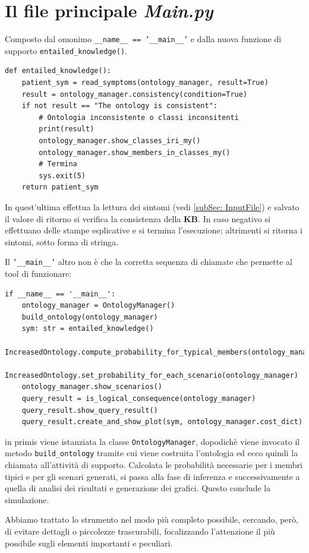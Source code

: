 \section{Il file principale \emph{Main.py}}
Composto  dal omonimo \texttt{__name__ == '__main__'} e dalla nuova funzione di 
supporto \texttt{entailed_knowledge()}.
\begin{verbatim}
def entailed_knowledge():
	patient_sym = read_symptoms(ontology_manager, result=True)
	result = ontology_manager.consistency(condition=True)
	if not result == "The ontology is consistent":
		# Ontologia inconsistente o classi inconsitenti
		print(result)
		ontology_manager.show_classes_iri_my()
		ontology_manager.show_members_in_classes_my()
		# Termina
		sys.exit(5)
	return patient_sym
\end{verbatim}
In quest'ultima effettua la lettura dei sintomi (vedi \ref{subSec: InputFile}) e salvato il
valore di ritorno si verifica la consistenza della \textbf{KB}. In caso negativo si effettuano delle stampe esplicative e si termina l'esecuzione; altrimenti si ritorna i sintomi, sotto forma di stringa.
                
Il \texttt{'__main__'} altro non è che la corretta sequenza di chiamate che 
permette al tool di funzionare: 
\begin{verbatim}
if __name__ == '__main__':
	ontology_manager = OntologyManager()
	build_ontology(ontology_manager)
	sym: str = entailed_knowledge()
	IncreasedOntology.compute_probability_for_typical_members(ontology_manager)
	IncreasedOntology.set_probability_for_each_scenario(ontology_manager)
	ontology_manager.show_scenarios()
	query_result = is_logical_consequence(ontology_manager)
	query_result.show_query_result()
	query_result.create_and_show_plot(sym, ontology_manager.cost_dict)
\end{verbatim}
in primis viene istanziata la classe \texttt{OntologyManager}, 
dopodichè viene invocato il metodo \texttt{build_ontology} tramite cui viene costruita l'ontologia ed ecco quindi la chiamata all'attività di supporto.
Calcolata le probabilità necessarie per i membri tipici e per gli scenari generati, si passa
alla fase di inferenza e successivamente a quella di analisi dei risultati e generazione dei
grafici. Questo conclude la simulazione.

Abbiamo trattato lo strumento nel modo più completo possibile, cercando, però, di evitare
dettagli o piccolezze trascurabili, focalizzando l'attenzione il più possibile sugli
elementi importanti e peculiari.

                                                            

